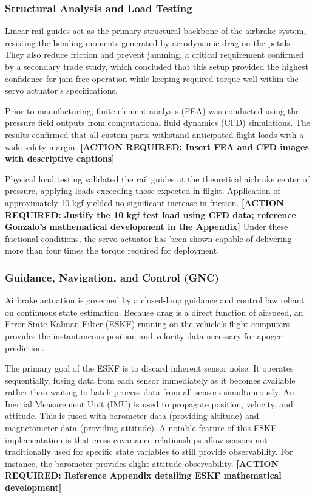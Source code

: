 \documentclass[11pt, a4paper]{article} %
\begin{document}
\subsubsection{Structural Analysis and Load Testing}

Linear rail guides act as the primary structural backbone of the airbrake system, resisting the bending moments generated by aerodynamic drag on the petals. They also reduce friction and prevent jamming, a critical requirement confirmed by a secondary trade study, which concluded that this setup provided the highest confidence for jam-free operation while keeping required torque well within the servo actuator's specifications.

Prior to manufacturing, finite element analysis (FEA) was conducted using the pressure field outputs from computational fluid dynamics (CFD) simulations. The results confirmed that all custom parts withstand anticipated flight loads with a wide safety margin. \textbf{[ACTION REQUIRED: Insert FEA and CFD images with descriptive captions]}

Physical load testing validated the rail guides at the theoretical airbrake center of pressure, applying loads exceeding those expected in flight. Application of approximately 10 kgf yielded no significant increase in friction. \textbf{[ACTION REQUIRED: Justify the 10 kgf test load using CFD data; reference Gonzalo's mathematical development in the Appendix]} Under these frictional conditions, the servo actuator has been shown capable of delivering more than four times the torque required for deployment.

\subsubsection{Guidance, Navigation, and Control (GNC)}

Airbrake actuation is governed by a closed-loop guidance and control law reliant on continuous state estimation. Because drag is a direct function of airspeed, an Error-State Kalman Filter (ESKF) running on the vehicle's flight computers provides the instantaneous position and velocity data necessary for apogee prediction. 

The primary goal of the ESKF is to discard inherent sensor noise. It operates sequentially, fusing data from each sensor immediately as it becomes available rather than waiting to batch process data from all sensors simultaneously. An Inertial Measurement Unit (IMU) is used to propagate position, velocity, and attitude. This is fused with barometer data (providing altitude) and magnetometer data (providing attitude). A notable feature of this ESKF implementation is that cross-covariance relationships allow sensors not traditionally used for specific state variables to still provide observability. For instance, the barometer provides slight attitude observability. \textbf{[ACTION REQUIRED: Reference Appendix detailing ESKF mathematical development]}
\end{document}
